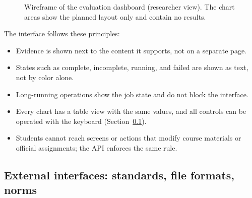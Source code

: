 \documentclass[12pt,a4paper]{article}
\begin{document}
\begin{figure}[htbp]
{%
}
\caption{Wireframe of the evaluation dashboard (researcher view). The
chart areas show the planned layout only and contain no results.}
\label{fig:wireframe-evaluation}
\end{figure}

The interface follows these principles:

\begin{itemize}
    \item Evidence is shown next to the content it supports, not on a
    separate page.

    \item States such as complete, incomplete, running, and failed are
    shown as text, not by color alone.

    \item Long-running operations show the job state and do not block
    the interface.

    \item Every chart has a table view with the same values, and all
    controls can be operated with the keyboard
    (Section~\ref{sec:architecture-external}).

    \item Students cannot reach screens or actions that modify course
    materials or official assignments; the API enforces the same
    rule.
\end{itemize}

\subsection{External interfaces: standards, file formats, norms}
\label{sec:architecture-external}
\end{document}
